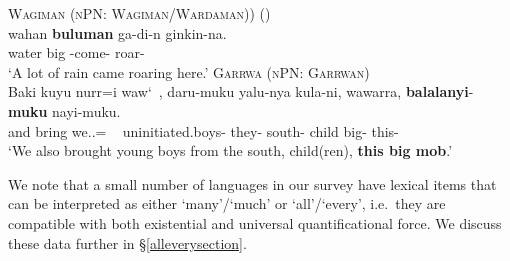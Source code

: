 \documentclass[12pt,egregdoesnotlikesansseriftitles]{scrartcl}
\begin{document}
\begin{exe}
  \ex \textsc{Wagiman (nPN: Wagiman/Wardaman))} \hfill (\citealt[67]{wilson06})\\
  \gll wahan \textbf{buluman} ga-di-n   ginkin-na.\\
  water   big  \Tsg-come-\Prs{} roar-\Asp\\
  \glt `A lot of rain came roaring here.'\label{bigquant1}
  \ex \textsc{Garrwa (nPN: Garrwan)}\hfill {}\\
  \gll Baki kuyu nurr=i waw\char`~, daru-muku yalu-nya kula-ni, wawarra, \textbf{balalanyi}-\textbf{muku} nayi-muku.\\
  and bring we.\Excl.\Nom=\Pst{} {\ } uninitiated.boys-\Pl{} they-\Acc{} south-\Abl{} child big-\Pl{} this-\Pl\\
  \glt `We also brought young boys from the south, child(ren), \textbf{this big mob}.'\label{bigquant2} %
\end{exe}

We note  that a small number of languages in our survey have lexical items that can be interpreted as either `many'/`much' or `all'/`every', i.e.\ they are compatible with both existential and universal quantificational force. We discuss these data further in \S\ref{alleverysection}.
\end{document}
